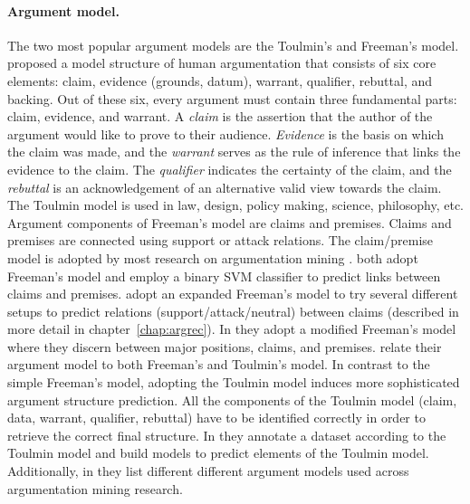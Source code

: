\paragraph{Argument model. } The two most popular argument models are the 
Toulmin's \citep{toulmin2003uses} and Freeman's \citep{freeman2011argument} model. 
\citet{toulmin2003uses} proposed a model structure of human argumentation that
consists of six core elements: claim, evidence (grounds, datum), warrant,
qualifier, rebuttal, and backing.  Out of these six, every argument must
contain three fundamental parts: claim, evidence, and warrant. A \emph{claim}
is the assertion that the author of the argument would like to prove to their
audience. \emph{Evidence} is the basis on which the claim was made, and the
\emph{warrant} serves as the rule of inference that links the evidence to the
claim. The \emph{qualifier} indicates the certainty of the claim, and the
\emph{rebuttal} is an acknowledgement of an alternative valid view towards the
claim.  The Toulmin model is used in law, design, policy making, science,
philosophy, etc.  
Argument components of Freeman's model are claims
and premises.  Claims and premises are connected using support or attack
relations.  The claim/premise model is adopted by most research on
argumentation mining \citep{palau2009argumentation, peldszus2013argument,
stab2014identifying, eckle2015role}.  \citep{stab2014identifying,
biran2011identifying} both adopt Freeman's model and employ a binary SVM
classifier to predict links between claims and premises.
\citet{boltuzic2014back} adopt an expanded Freeman's model to try several
different setups to predict relations (support/attack/neutral) between claims
(described in more detail in chapter~\ref{chap:argrec}).  In
\citep{stab2014annotating, liebeck2016airport} they adopt a modified Freeman's
model where they discern between major positions, claims, and premises. 
\citet{liebeck2016airport} relate their argument model
to both Freeman's and Toulmin's model. In contrast to the simple
Freeman's model, adopting the Toulmin model induces more sophisticated argument
structure prediction. All the components of the Toulmin model (claim, data,
warrant, qualifier, rebuttal) have to be identified correctly in order to
retrieve the correct final structure.  In \citep{habernal2014argumentation}
they annotate a dataset according to the Toulmin model and build models to
predict elements of the Toulmin model.  Additionally, in
\citep{habernal2014argumentation} they list different different argument models
used across argumentation mining research.

